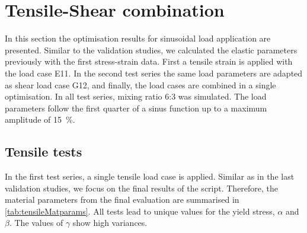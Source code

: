 


\section{Tensile-Shear combination}
In this section the optimisation results for sinusoidal load application are presented. Similar to the validation studies, we calculated the elastic parameters previously with the first stress-strain data. First a tensile strain is applied with the load case E11. In the second test series the same load parameters are adapted as shear load case G12, and finally, the load cases are combined in a single optimisation. In all test series, mixing ratio 6:3 was simulated. The load parameters follow the first quarter of a sinus function up to a maximum amplitude of 15 \%. 

\subsection{Tensile tests}
In the first test series, a single tensile load case is applied. Similar as in the last validation studies, we focus on the final results of the script. Therefore, the material parameters from the final evaluation are summarised in \autoref{tab:tensileMatparams}. All tests lead to unique values for the yield stress, $\alpha$ and $\beta$. The values of $\gamma$ show high variances. 

